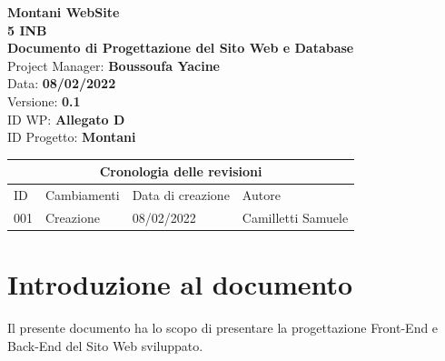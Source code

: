 \documentclass{article}
\begin{document}
	
	
	\begin{titlepage}
		\begin{center}
			\huge\textbf{Montani WebSite}\\
			\Large\textbf{5 INB}\\
			\Large \textbf{Documento di Progettazione del Sito Web e Database}\\
			\vspace{4cm}
			\large Project Manager: \textbf{Boussoufa Yacine}\\
			\large Data: \textbf{08/02/2022}\\
			\large Versione: \textbf{0.1}\\
			\large ID WP: \textbf{Allegato D}\\
			\large ID Progetto: \textbf{Montani}\\
			
		\end{center}
	\end{titlepage}
	
	\clearpage
	
	\begin{tabular}{ |p{1cm}|p{4cm}|p{3cm}|p{2cm}|  }
		\hline
		\multicolumn{4}{|c|}{Cronologia delle revisioni} \\
		\hline
		ID& Cambiamenti &Data di creazione&Autore\\
		\hline
		001   & Creazione    &08/02/2022&   Camilletti Samuele\\
		\hline
	\end{tabular}
	
	\clearpage
	
	\tableofcontents
	\printindex	
	
   

	\section{\textbf{Introduzione al documento}}
	\flushleft
	\normalsize
	Il presente documento ha lo scopo di presentare la progettazione Front-End e Back-End del Sito Web sviluppato.
	\normalsize
\end{document}
